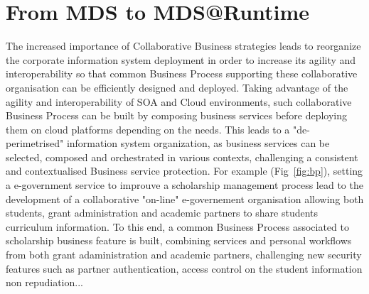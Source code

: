 \documentclass[runningheads,a4paper]{llncs}
\begin{document}
\section{From MDS to MDS@Runtime}
\label{mdsToMds@Runtime}
The increased importance of Collaborative Business strategies leads to reorganize the corporate information system deployment in order to increase its agility and interoperability so that common Business Process supporting these collaborative organisation can be efficiently designed and deployed. Taking advantage of the agility and interoperability of SOA and Cloud environments, such collaborative Business Process can be built by composing business services before deploying them on cloud platforms depending on the needs. This leads to a "de-perimetrised" information system organization, as business services can be selected,  composed and orchestrated in various contexts, challenging a consistent and contextualised Business service protection.
For example (Fig~\ref{fig:bp}), setting a e-government service to improuve a scholarship management process
 lead to the development of a collaborative "on-line" e-governement organisation allowing both students, grant administration and academic partners to share students curriculum information. To this end, a common Business Process associated to scholarship business feature is built, combining services and personal workflows from both grant adaministration and academic partners, challenging new security features such as partner authentication, access control on the student information non repudiation...  
\end{document}
